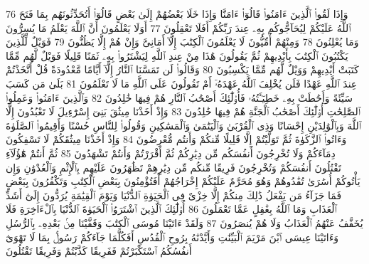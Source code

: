 {\tiny\colorbox{cl_aya}{76}} وَإِذَا لَقُوا۟ ٱلَّذِينَ ءَامَنُوا۟ قَالُوٓا۟ ءَامَنَّا وَإِذَا خَلَا بَعْضُهُمْ إِلَىٰ بَعْضٍ قَالُوٓا۟ أَتُحَدِّثُونَهُم بِمَا فَتَحَ ٱللَّهُ عَلَيْكُمْ لِيُحَآجُّوكُم بِهِۦ عِندَ رَبِّكُمْ أَفَلَا تَعْقِلُونَ
{\tiny\colorbox{cl_aya}{77}} أَوَلَا يَعْلَمُونَ أَنَّ ٱللَّهَ يَعْلَمُ مَا يُسِرُّونَ وَمَا يُعْلِنُونَ
{\tiny\colorbox{cl_aya}{78}} وَمِنْهُمْ أُمِّيُّونَ لَا يَعْلَمُونَ ٱلْكِتَٰبَ إِلَّآ أَمَانِىَّ وَإِنْ هُمْ إِلَّا يَظُنُّونَ
{\tiny\colorbox{cl_aya}{79}} فَوَيْلٌ لِّلَّذِينَ يَكْتُبُونَ ٱلْكِتَٰبَ بِأَيْدِيهِمْ ثُمَّ يَقُولُونَ هَٰذَا مِنْ عِندِ ٱللَّهِ لِيَشْتَرُوا۟ بِهِۦ ثَمَنًا قَلِيلًا فَوَيْلٌ لَّهُم مِّمَّا كَتَبَتْ أَيْدِيهِمْ وَوَيْلٌ لَّهُم مِّمَّا يَكْسِبُونَ
{\tiny\colorbox{cl_aya}{80}} وَقَالُوا۟ لَن تَمَسَّنَا ٱلنَّارُ إِلَّآ أَيَّامًا مَّعْدُودَةً قُلْ أَتَّخَذْتُمْ عِندَ ٱللَّهِ عَهْدًا فَلَن يُخْلِفَ ٱللَّهُ عَهْدَهُۥٓ أَمْ تَقُولُونَ عَلَى ٱللَّهِ مَا لَا تَعْلَمُونَ
{\tiny\colorbox{cl_aya}{81}} بَلَىٰ مَن كَسَبَ سَيِّئَةً وَأَحَٰطَتْ بِهِۦ خَطِيٓـَٔتُهُۥ فَأُو۟لَٰٓئِكَ أَصْحَٰبُ ٱلنَّارِ هُمْ فِيهَا خَٰلِدُونَ
{\tiny\colorbox{cl_aya}{82}} وَٱلَّذِينَ ءَامَنُوا۟ وَعَمِلُوا۟ ٱلصَّٰلِحَٰتِ أُو۟لَٰٓئِكَ أَصْحَٰبُ ٱلْجَنَّةِ هُمْ فِيهَا خَٰلِدُونَ
{\tiny\colorbox{cl_aya}{83}} وَإِذْ أَخَذْنَا مِيثَٰقَ بَنِىٓ إِسْرَٰٓءِيلَ لَا تَعْبُدُونَ إِلَّا ٱللَّهَ وَبِٱلْوَٰلِدَيْنِ إِحْسَانًا وَذِى ٱلْقُرْبَىٰ وَٱلْيَتَٰمَىٰ وَٱلْمَسَٰكِينِ وَقُولُوا۟ لِلنَّاسِ حُسْنًا وَأَقِيمُوا۟ ٱلصَّلَوٰةَ وَءَاتُوا۟ ٱلزَّكَوٰةَ ثُمَّ تَوَلَّيْتُمْ إِلَّا قَلِيلًا مِّنكُمْ وَأَنتُم مُّعْرِضُونَ
{\tiny\colorbox{cl_aya}{84}} وَإِذْ أَخَذْنَا مِيثَٰقَكُمْ لَا تَسْفِكُونَ دِمَآءَكُمْ وَلَا تُخْرِجُونَ أَنفُسَكُم مِّن دِيَٰرِكُمْ ثُمَّ أَقْرَرْتُمْ وَأَنتُمْ تَشْهَدُونَ
{\tiny\colorbox{cl_aya}{85}} ثُمَّ أَنتُمْ هَٰٓؤُلَآءِ تَقْتُلُونَ أَنفُسَكُمْ وَتُخْرِجُونَ فَرِيقًا مِّنكُم مِّن دِيَٰرِهِمْ تَظَٰهَرُونَ عَلَيْهِم بِٱلْإِثْمِ وَٱلْعُدْوَٰنِ وَإِن يَأْتُوكُمْ أُسَٰرَىٰ تُفَٰدُوهُمْ وَهُوَ مُحَرَّمٌ عَلَيْكُمْ إِخْرَاجُهُمْ أَفَتُؤْمِنُونَ بِبَعْضِ ٱلْكِتَٰبِ وَتَكْفُرُونَ بِبَعْضٍ فَمَا جَزَآءُ مَن يَفْعَلُ ذَٰلِكَ مِنكُمْ إِلَّا خِزْىٌ فِى ٱلْحَيَوٰةِ ٱلدُّنْيَا وَيَوْمَ ٱلْقِيَٰمَةِ يُرَدُّونَ إِلَىٰٓ أَشَدِّ ٱلْعَذَابِ وَمَا ٱللَّهُ بِغَٰفِلٍ عَمَّا تَعْمَلُونَ
{\tiny\colorbox{cl_aya}{86}} أُو۟لَٰٓئِكَ ٱلَّذِينَ ٱشْتَرَوُا۟ ٱلْحَيَوٰةَ ٱلدُّنْيَا بِٱلْءَاخِرَةِ فَلَا يُخَفَّفُ عَنْهُمُ ٱلْعَذَابُ وَلَا هُمْ يُنصَرُونَ
{\tiny\colorbox{cl_aya}{87}} وَلَقَدْ ءَاتَيْنَا مُوسَى ٱلْكِتَٰبَ وَقَفَّيْنَا مِنۢ بَعْدِهِۦ بِٱلرُّسُلِ وَءَاتَيْنَا عِيسَى ٱبْنَ مَرْيَمَ ٱلْبَيِّنَٰتِ وَأَيَّدْنَٰهُ بِرُوحِ ٱلْقُدُسِ أَفَكُلَّمَا جَآءَكُمْ رَسُولٌۢ بِمَا لَا تَهْوَىٰٓ أَنفُسُكُمُ ٱسْتَكْبَرْتُمْ فَفَرِيقًا كَذَّبْتُمْ وَفَرِيقًا تَقْتُلُونَ
